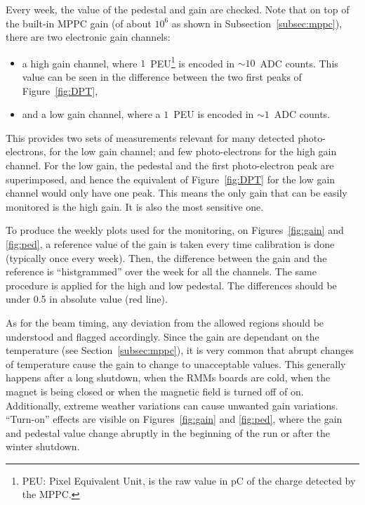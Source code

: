 Every week, the value of the pedestal and gain are checked. Note that
on top of the built-in \Gls{MPPC} gain (of about $10^6$ as shown in
Subsection~\ref{subsec:mppc}), there are two electronic gain channels:
\begin{itemize}[noitemsep,topsep=0pt]
\item a high gain channel, where $1$~\Gls{PEU}\footnote{PEU: Pixel
    Equivalent Unit, is the raw value in pC of the charge detected by
    the \Gls{MPPC}.} is encoded in $\sim 10$~\Gls{ADC} counts. This
  value can be seen in the difference between the two first peaks of
  Figure~\ref{fig:DPT},
\item and a low gain channel, where a $1$~\Gls{PEU} is encoded in
  $\sim 1$~\Gls{ADC} counts.
\end{itemize}
This provides two sets of measurements relevant for many detected
photo-electrons, for the low gain channel; and few photo-electrons for
the high gain channel. For the low gain, the pedestal and the first
photo-electron peak are superimposed, and hence the equivalent of
Figure~\ref{fig:DPT} for the low gain channel would only have one
peak. This means the only gain that can be easily monitored is the
high gain. It is also the most sensitive one.

To produce the weekly plots used for the monitoring, on
Figures~\ref{fig:gain} and \ref{fig:ped}, a reference value of the
gain is taken every time calibration is done (typically once every
week). Then, the difference between the gain and the reference is
``histgrammed'' over the week for all the channels. The same procedure
is applied for the high and low pedestal. The differences should be
under 0.5 in absolute value (red line).

As for the beam timing, any deviation from the allowed regions should
be understood and flagged accordingly. Since the gain are dependant on
the temperature (see Section~\ref{subsec:mppc}), it is very common
that abrupt changes of temperature cause the gain to change to
unacceptable values. This generally happens after a long shutdown,
when the \Glspl{RMM} boards are cold, when the magnet is being closed
or when the magnetic field is turned off of on. Additionally, extreme
weather variations can cause unwanted gain variations. ``Turn-on''
effects are visible on Figures~\ref{fig:gain} and \ref{fig:ped}, where
the gain and pedestal value change abruptly in the beginning of the
run or after the winter shutdown.

